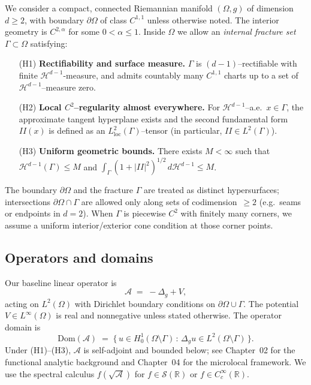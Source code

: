 We consider a compact, connected Riemannian manifold $(\Omega,g)$ of
dimension $d\ge 2$, with boundary $\partial\Omega$ of class $C^{1,1}$ unless
otherwise noted. The interior geometry is $C^{2,\alpha}$ for some
$0<\alpha\le 1$. Inside $\Omega$ we allow an \emph{internal fracture set}
$\Gamma\subset \Omega$ satisfying:
\begin{itemize}
  \item[(H1)] \textbf{Rectifiability and surface measure.}
  $\Gamma$ is $(d-1)$–rectifiable with finite $\mathcal{H}^{d-1}$-measure,
  and admits countably many $C^{1,1}$ charts up to a set of
  $\mathcal{H}^{d-1}$–measure zero.
  \item[(H2)] \textbf{Local $C^2$–regularity almost everywhere.}
  For $\mathcal{H}^{d-1}$–a.e.\ $x\in\Gamma$, the approximate tangent
  hyperplane exists and the second fundamental form $II(x)$ is defined as an
  $L^2_{\text{loc}}(\Gamma)$–tensor (in particular, $II\in L^2(\Gamma)$).
  \item[(H3)] \textbf{Uniform geometric bounds.}
  There exists $M<\infty$ such that
  $\mathcal{H}^{d-1}(\Gamma)\le M$ and
  $\int_\Gamma (1+|II|^2)^{1/2}\,d\mathcal{H}^{d-1}\le M$.
\end{itemize}
The boundary $\partial\Omega$ and the fracture $\Gamma$ are treated as
distinct hypersurfaces; intersections $\partial\Omega\cap\Gamma$ are allowed
only along sets of codimension~$\ge 2$ (e.g.\ seams or endpoints in $d=2$).
When $\Gamma$ is piecewise $C^2$ with finitely many corners, we assume a
uniform interior/exterior cone condition at those corner points.

\subsection{Operators and domains}
\label{sub:intro-operators}

Our baseline linear operator is
\[
  \mathcal{A} \;=\; -\Delta_g + V,
\]
acting on $L^2(\Omega)$ with Dirichlet boundary conditions on
$\partial\Omega\cup\Gamma$. The potential $V\in L^\infty(\Omega)$ is real
and nonnegative unless stated otherwise. The operator domain is
\[
  \mathrm{Dom}(\mathcal{A}) \;=\;
  \{\, u\in H^1_0(\Omega\setminus\Gamma)\,:\,
      \Delta_g u \in L^2(\Omega\setminus\Gamma)\,\}.
\]
Under (H1)–(H3), $\mathcal{A}$ is self-adjoint and bounded below; see
Chapter~02 for the functional analytic background and
Chapter~04 for the microlocal framework. We use the spectral calculus
$f(\sqrt{\mathcal{A}})$ for $f\in \mathcal{S}(\mathbb{R})$ or
$f\in C_c^\infty(\mathbb{R})$.


